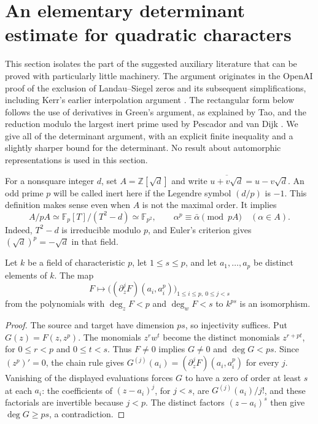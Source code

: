 \section{An elementary determinant estimate for quadratic characters}
\label{sz-section}

This section isolates the part of the suggested auxiliary literature that can
be proved with particularly little machinery. The argument originates in the
OpenAI proof of the exclusion of Landau--Siegel zeros and its subsequent
simplifications, including Kerr's earlier interpolation argument
\cite{sz-kerr}. The rectangular form below follows the use of derivatives
in Green's argument, as explained by Tao, and the reduction modulo the largest
inert prime used by Pescador and van Dijk
\cite{sz-openai,sz-tao,sz-pescador,sz-vandijk}.
We give all of the determinant argument, with an explicit finite inequality
and a slightly sharper bound for the determinant. No result about automorphic
representations is used in this section.

For a nonsquare integer $d$, set $A=\mathbb Z[\sqrt d]$ and write
$\overline{u+v\sqrt d}=u-v\sqrt d$. An odd prime $p$ will be called inert
here if the Legendre symbol $(d/p)$ is $-1$. This definition makes sense even
when $A$ is not the maximal order. It implies
\begin{equation}\label{sz-frobenius}
 A/pA\simeq\mathbb F_p[T]/(T^2-d)\simeq\mathbb F_{p^2},
 \qquad \alpha^p\equiv\bar\alpha\pmod {pA}\quad(\alpha\in A).
\end{equation}
Indeed, $T^2-d$ is irreducible modulo $p$, and Euler's criterion gives
$(\sqrt d)^p=-\sqrt d$ in that field.

\begin{lemma}\label{sz-interpolation}
Let $k$ be a field of characteristic $p$, let $1\le s\le p$, and let
$a_1,\ldots,a_p$ be distinct elements of $k$. The map
\[
 F\longmapsto\bigl((\partial_z^jF)(a_i,a_i^p)\bigr)_{
          1\le i\le p,\ 0\le j<s}
\]
from the polynomials with $\deg_z F<p$ and $\deg_w F<s$ to $k^{ps}$
is an isomorphism.
\end{lemma}
\begin{proof}
The source and target have dimension $ps$, so injectivity suffices. Put
$G(z)=F(z,z^p)$. The monomials $z^rw^t$ become the distinct monomials
$z^{r+pt}$, for $0\le r<p$ and $0\le t<s$. Thus $F\ne0$ implies
$G\ne0$ and $\deg G<ps$. Since $(z^p)'=0$, the chain rule gives
$G^{(j)}(a_i)=(\partial_z^jF)(a_i,a_i^p)$ for every $j$. Vanishing of the
displayed evaluations forces $G$ to have a zero of order at least $s$ at
each $a_i$: the coefficients of $(z-a_i)^j$, for $j<s$, are
$G^{(j)}(a_i)/j!$, and these factorials are invertible because $j<p$.
The distinct factors $(z-a_i)^s$ then give $\deg G\ge ps$, a contradiction.
\end{proof}

